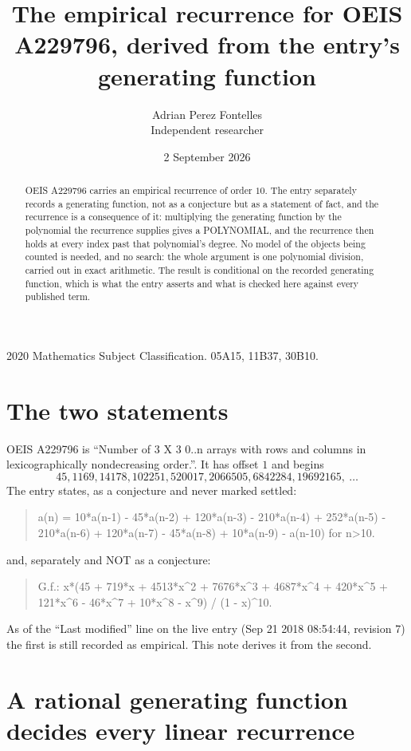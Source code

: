\documentclass[11pt,a4paper]{article}
\title{The empirical recurrence for OEIS A229796, derived from the entry's generating function}
\author{Adrian Perez Fontelles\\ \small Independent researcher}
\date{2 September 2026}
\theoremstyle{plain}
\theoremstyle{definition}
\begin{document}
\maketitle

\begin{abstract}
OEIS A229796 carries an empirical recurrence of order $10$. The entry separately records a
generating function, not as a conjecture but as a statement of fact, and the recurrence is a
consequence of it: multiplying the generating function by the polynomial the recurrence
supplies gives a POLYNOMIAL, and the recurrence then holds at every index past that
polynomial's degree. No model of the objects being counted is needed, and no search: the
whole argument is one polynomial division, carried out in exact arithmetic. The result is
conditional on the recorded generating function, which is what the entry asserts and what is
checked here against every published term.
\end{abstract}

\noindent\small 2020 Mathematics Subject Classification. 05A15, 11B37, 30B10.\normalsize

\section{The two statements}

OEIS A229796 is ``Number of 3 X 3 0..n arrays with rows and columns in lexicographically nondecreasing order.''. It has offset $1$ and begins
\[
45, 1169, 14178, 102251, 520017, 2066505, 6842284, 19692165,\ \dots
\]
The entry states, as a conjecture and never marked settled:
\begin{quote}
a(n) = 10*a(n-1) - 45*a(n-2) + 120*a(n-3) - 210*a(n-4) + 252*a(n-5) - 210*a(n-6) + 120*a(n-7) - 45*a(n-8) + 10*a(n-9) - a(n-10) for n>10.
\end{quote}
and, separately and NOT as a conjecture:
\begin{quote}
G.f.: x*(45 + 719*x + 4513*x\^{}2 + 7676*x\^{}3 + 4687*x\^{}4 + 420*x\^{}5 + 121*x\^{}6 - 46*x\^{}7 + 10*x\^{}8 - x\^{}9) / (1 - x)\^{}10.
\end{quote}
As of the ``Last modified'' line on the live entry (Sep 21 2018 08:54:44, revision 7) the first is still
recorded as empirical. This note derives it from the second.

\section{A rational generating function decides every linear recurrence}
\end{document}
